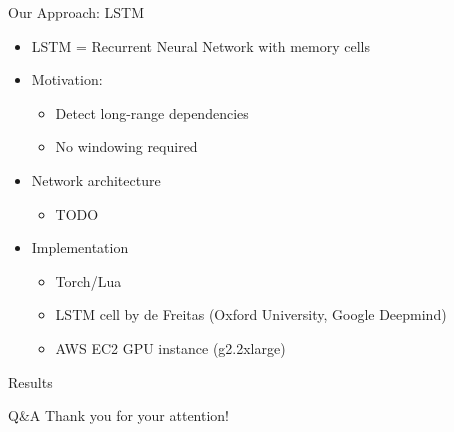 \documentclass{beamer}
\begin{document}
\begin{frame}{Our Approach: LSTM}
    \begin{itemize}
        \item
            LSTM = Recurrent Neural Network with memory cells
        \item
            Motivation:
            \begin{itemize}
            \item
                Detect long-range dependencies
            \item
                No windowing required
            \end{itemize}
        \item
            Network architecture
            \begin{itemize}
                \item TODO
            \end{itemize}
        \item
            Implementation
            \begin{itemize}
                \item
                    Torch/Lua
                \item
                    LSTM cell by
                    de Freitas (Oxford University, Google Deepmind)
                \item
                    AWS EC2 GPU instance (g2.2xlarge)
            \end{itemize}
    \end{itemize}
\end{frame}

\begin{frame}{Results}
\end{frame}

\begin{frame}{Q\&A}
    \Large
    \centering
    Thank you for your attention!
\end{frame}
\end{document}
